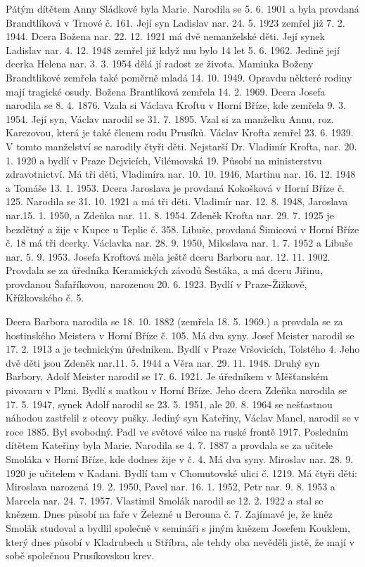 \documentclass[../dejiny-rodu-prusiku.tex]{subfiles}
\begin{document}
Pátým dítětem Anny Sládkové byla Marie. Narodila se 5. 6. 1901 a byla provdaná Brandtlíková v Trnové č. 161. Její syn Ladislav nar. 24. 5. 1923 zemřel již 7. 2. 1944. Dcera Božena nar. 22. 12. 1921 má dvě nemanželské děti. Její synek Ladislav nar. 4. 12. 1948 zemřel již když mu bylo 14 let 5. 6. 1962. Jedině její dcerka Helena nar. 3. 3. 1954 dělá jí radost ze života. Maminka Boženy Brandtlikové zemřela také poměrně mladá 14. 10. 1949. Opravdu některé rodiny mají tragické osudy. Božena Brantlíková zemřela 14. 2. 1969. Dcera Josefa narodila se 8. 4. 1876. Vzala si Václava Kroftu v Horní Bříze, kde zemřela 9. 3. 1954. Její syn, Václav narodil se 31. 7. 1895. Vzal si za manželku Annu, roz. Karezovou, která je také členem rodu Prusíků. Václav Krofta zemřel 23. 6. 1939. V tomto manželství se narodily čtyři děti. Nejstarší Dr. Vladimír Krofta, nar. 20. 1. 1920 a bydlí v Praze Dejvicích, Vilémovská 19. Působí na ministerstvu zdravotnictví. Má tři děti, Vladimíra nar. 10. 10. 1946, Martinu nar. 16. 12. 1948 a Tomá­še 13. 1. 1953. Dcera Jaroslava je provdaná Kokošková v Horní Bříze č. 125. Narodila se 31. 10. 1921 a má tři dě­ti. Vladimír nar. 12. 8. 1948, Jaroslava nar.15. 1. 1950, a Zdeňka nar. 11. 8. 1954. Zdeněk Krofta nar. 29. 7. 1925 je bezdětný a žije v Kupce u Teplic č. 358. Libuše, provdaná Šimicová v Horní Bříze č. 18 má tři dcerky. Václavka nar. 28. 9. 1950, Miloslava nar. 1. 7. 1952 a Libuše nar. 5. 9. 1953. Josefa Kroftová měla ještě dceru Barboru nar. 12. 11. 1902. Provdala se za úředníka Keramických závodů Šestáka, a má dceru Jiřinu, provdanou Šafaříkovou, narozenou 20. 6. 1923. Bydlí v Praze-Žižkově, Křížkovského č. 5.

Dcera Barbora narodila se 18. 10. 1882 (zemřela 18. 5. 1969.) a provdala se za hostinského Meistera v Horní Bříze č. 105. Má dva syny. Josef Meister narodil se 17. 2. 1913 a je technickým úřed­níkem. Bydlí v Praze Vršovicích, Tolstého 4. Jeho dvě děti jsou Zdeněk nar.11. 5. 1944 a Věra nar. 29. 11. 1948. Druhý syn Barbory, Adolf Meister narodil se 17. 6. 1921. Je úředníkem v Měšťanském pivovaru v Plzni. Bydlí s matkou v Horní Bříze. Jeho dcera Zdeňka narodila se 17. 5. 1947, synek Adolf narodil se 23. 5. 1951, ale 20. 8. 1964 se nešťastnou náhodou zastřelil z otcovy pušky. Jediný syn Kateřiny, Václav Mancl, narodil se v roce 1885. Byl svobodný. Padl ve světové válce na ruské frontě 1917. Posledním dítětem Kateřiny byla Marie. Narodila se 4. 7. 1887 a provdala se za učitele Smoláka v Horní Bříze, kde dodnes žije v č. 4. Má dva syny. Miroslav nar. 28. 9. 1920 je učitelem v Kadani. Bydlí tam v Chomutovské ulici č. 1219. Má čtyři děti: Miroslava narozená 19. 2. 1950, Pavel nar. 16. 1. 1952, Petr nar. 9. 8. 1953 a Marcela nar. 24. 7. 1957. Vlastimil Smolák narodil se 12. 2. 1922 a stal se knězem. Dnes působí na faře v Železné u Berouna č. 7. Zajímavé je, že kněz Smolák studoval a bydlil společně v semináři s jiným knězem Josefem Kouklem, který dnes působí v Kladrubech u Stříbra, ale tehdy oba nevěděli jistě, že mají v sobě společnou Prusíkovskou krev.
\end{document}
